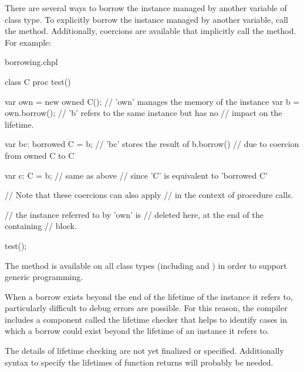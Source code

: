 There are several ways to borrow the instance managed by another variable
of class type. To explicitly borrow the instance managed by another
variable, call the  method. Additionally, coercions
are available that implicitly call the  method. For example:

\begin{chapelexample}{borrowing.chpl}
\begin{chapel}
class C { }
proc test() {
  var own = new owned C(); // 'own' manages the memory of the instance
  var b = own.borrow();    // 'b' refers to the same instance but has no
                           // impact on the lifetime.

  var bc: borrowed C = b;  // 'bc' stores the result of b.borrow()
                           // due to coercion from owned C to C

  var c: C = b;            // same as above
                           // since 'C' is equivalent to 'borrowed C'

                           // Note that these coercions can also apply
                           // in the context of procedure calls.

                           // the instance referred to by 'own' is
                           // deleted here, at the end of the containing
                           // block.
}
\end{chapel}
\begin{chapelpost}
test();
\end{chapelpost}
\begin{chapeloutput}
\end{chapeloutput}
\end{chapelexample}

The  method is available on all class types (including
 and ) in order to support generic
programming.

When a borrow exists beyond the end of the lifetime of the instance it
refers to, particularly difficult to debug errors are possible. For this
reason, the compiler includes a component called the lifetime checker that
helps to identify cases in which a borrow could exist beyond the lifetime
of an instance it refers to.

\begin{future}
  The details of lifetime checking are not yet finalized or specified.
  Additionally syntax to specify the lifetimes of function returns will
  probably be needed.
\end{future}

